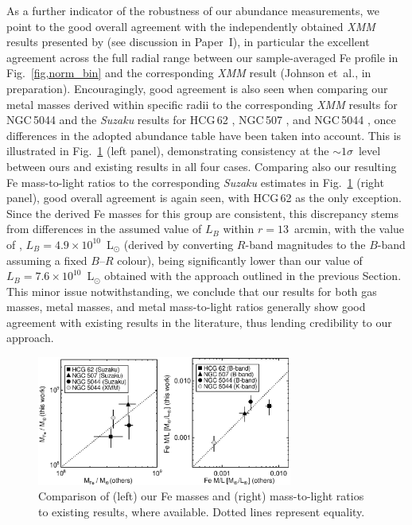 \documentclass[useAMS,usenatbib]{mn2e}
\begin{document}
As a further indicator of the robustness of our abundance
measurements, we point to the good overall agreement with the
independently obtained {\em XMM} results presented by
\citet{fino06,fino07} (see discussion in Paper~I), in particular the
excellent agreement across the full radial range between our
sample-averaged Fe profile in Fig.~\ref{fig,norm_bin} and the
corresponding {\em XMM} result (Johnson et~al., in
preparation). Encouragingly, good agreement is also seen when
comparing our metal masses derived within specific radii to the
corresponding {\em XMM} results for NGC\,5044 \citep*{buot04} and the
{\em Suzaku} results for HCG\,62 \citep{toko08}, NGC\,507
\citep{sato09}, and NGC\,5044 \citep{komi09}, once differences in the
adopted abundance table have been taken into account. This is
illustrated in Fig.~\ref{fig,compare2} (left panel), demonstrating
consistency at the $\sim 1\sigma$~level between ours and existing
results in all four cases. Comparing also our resulting Fe
mass-to-light ratios to the corresponding {\em Suzaku} estimates in
Fig.~\ref{fig,compare2} (right panel), good overall agreement is again
seen, with HCG\,62 as the only exception. Since the derived Fe masses
for this group are consistent, this discrepancy stems from differences
in the assumed value of $L_B$ within $r=13$~arcmin, with the value of
\citet{toko08}, $L_B=4.9\times 10^{10}$~L$_\odot$ (derived by
converting $R$-band magnitudes to the $B$-band assuming a fixed
$B$--$R$ colour), being significantly lower than our value of
$L_B=7.6\times 10^{10}$~L$_\odot$ obtained with the approach outlined
in the previous Section. This minor issue notwithstanding, we conclude
that our results for both gas masses, metal masses, and metal
mass-to-light ratios generally show good agreement with existing
results in the literature, thus lending credibility to our approach.


\begin{figure} 
 \includegraphics[width=84mm]{fig5.eps}
 \caption{Comparison of (left) our Fe masses and (right) mass-to-light
      ratios to existing results, where available. Dotted lines
      represent equality.}
\label{fig,compare2}
\end{figure} 
\end{document}
